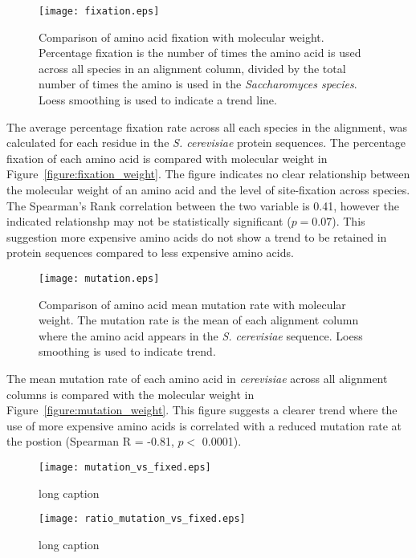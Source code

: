 \begin{figure}
  \centering
  \texttt{[image: fixation.eps]}
  \caption[Comparison of amino acid fixation with molecular weight]{Comparison of amino acid fixation with molecular weight. Percentage fixation is the number of times the amino acid is used across all species in an alignment column, divided by the total number of times the amino is used in the \emph{Saccharomyces species}. Loess smoothing is used to indicate a trend line.}
  \label{figure:fixation_weight}
\end{figure}

The average percentage fixation rate across all each species in the alignment, was calculated for each residue in the \emph{S. cerevisiae} protein sequences. The percentage fixation of each amino acid is compared with molecular weight in Figure~\vref{figure:fixation_weight}. The figure indicates no clear relationship between the molecular weight of an amino acid and the level of site-fixation across species. The Spearman's Rank correlation between the two variable is 0.41, however the indicated relationshp may not be statistically significant ($p = 0.07$). This suggestion more expensive amino acids do not show a trend to be retained in protein sequences compared to less expensive amino acids.

\begin{figure}
  \centering
  \texttt{[image: mutation.eps]}
  \caption[Comparison of amino acid mean mutation rate with molecular weight]{Comparison of amino acid mean mutation rate with molecular weight. The mutation rate is the mean of each alignment column where the amino acid appears in the \emph{S. cerevisiae} sequence. Loess smoothing is used to indicate trend.}
  \label{figure:mutation_weight}
\end{figure}

The mean mutation rate of each amino acid in \emph{cerevisiae} across all alignment columns is compared with the molecular weight in Figure~\vref{figure:mutation_weight}. This figure suggests a clearer trend where the use of more expensive amino acids is correlated with a reduced mutation rate at the postion (Spearman R = -0.81, $p <$ 0.0001).

\begin{figure}
  \centering
  \texttt{[image: mutation\_vs\_fixed.eps]}
  \caption[short caption]{long caption}
  \label{figure:mutation_vs_fixed}
\end{figure}

\begin{figure}
  \centering
  \texttt{[image: ratio\_mutation\_vs\_fixed.eps]}
  \caption[short caption]{long caption}
  \label{figure:ratio_mutation_vs_fixed}
\end{figure}

